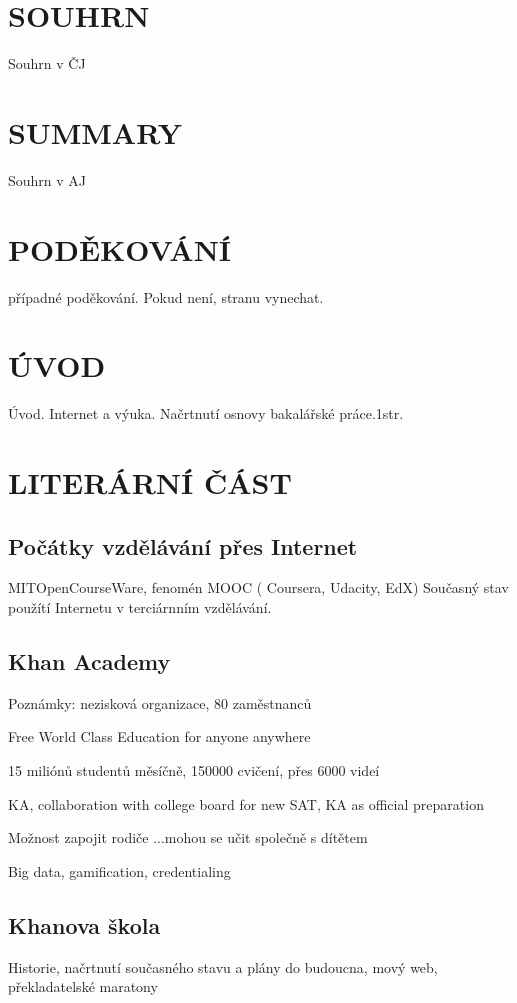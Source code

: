 \documentclass[a4paper, 12pt]{article}
\begin{document}
%
%
\section*{SOUHRN}

Souhrn v ČJ

\section*{SUMMARY}
Souhrn v AJ

%
%
\newpage
\section*{PODĚKOVÁNÍ}
případné poděkování. Pokud není, stranu vynechat.


\tableofcontents
\newpage

\section{ÚVOD}
Úvod. Internet a výuka. Načrtnutí osnovy bakalářské práce.1str.

\newpage
\section{LITERÁRNÍ ČÁST}

\subsection{Počátky vzdělávání přes Internet}
MITOpenCourseWare, fenomén MOOC ( Coursera, Udacity, EdX)
Současný stav použítí Internetu v terciárnním vzdělávání.

\subsection{Khan Academy}

Poznámky: nezisková organizace, 80 zaměstnanců

Free World Class Education for anyone anywhere

15 miliónů studentů měsíčně, 150000 cvičení, přes 6000 videí

KA, collaboration with college board for new SAT, KA as official preparation

Možnost zapojit rodiče ...mohou se učit společně s dítětem

Big data, gamification, credentialing

\subsection{Khanova škola}
Historie, načrtnutí současného stavu a plány do budoucna, mový web, překladatelské maratony
\end{document}
